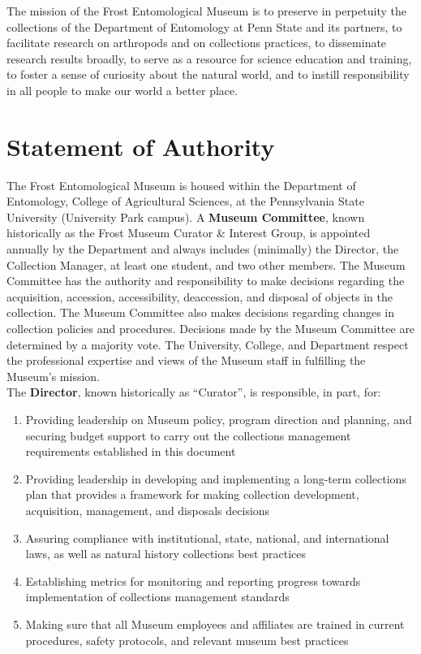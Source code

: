 \documentclass[letterpaper, 11pt]{article}
\begin{document}
The mission of the Frost Entomological Museum is to preserve in perpetuity the collections of the Department of Entomology at Penn State and its partners, to facilitate research on arthropods and on collections practices, to disseminate research results broadly, to serve as a resource for science education and training, to foster a sense of curiosity about the natural world, and to instill responsibility in all people to make our world a better place.

\clearpage
\section{Statement of Authority}
The Frost Entomological Museum is housed within the Department of Entomology, College of Agricultural Sciences, at the Pennsylvania State University (University Park campus). A \textbf{Museum Committee}, known historically as the Frost Museum Curator \& Interest Group, is appointed annually by the Department and always includes (minimally) the Director, the Collection Manager, at least one student, and two other members. The Museum Committee has the authority and responsibility to make decisions regarding the acquisition, accession, accessibility, deaccession, and disposal of objects in the collection. The Museum Committee also makes decisions regarding changes in collection policies and procedures. Decisions made by the Museum Committee are determined by a majority vote. The University, College, and Department respect the professional expertise and views of the Museum staff in fulfilling the Museum's mission.%
\\

\noindent{}The \textbf{Director}, known historically as ``Curator'', is responsible, in part, for:
\begin{enumerate}
\item Providing leadership on Museum policy, program direction and planning, and securing budget support to carry out the collections management requirements established in this document
\item Providing leadership in developing and implementing a long-term collections plan that provides a framework for making collection development, acquisition, management, and disposals decisions
\item Assuring compliance with institutional, state, national, and international laws, as well as natural history collections best practices
\item Establishing metrics for monitoring and reporting progress towards implementation of collections management standards
\item Making sure that all Museum employees and affiliates are trained in current procedures, safety protocols, and relevant museum best practices
\end{enumerate}
\end{document}
